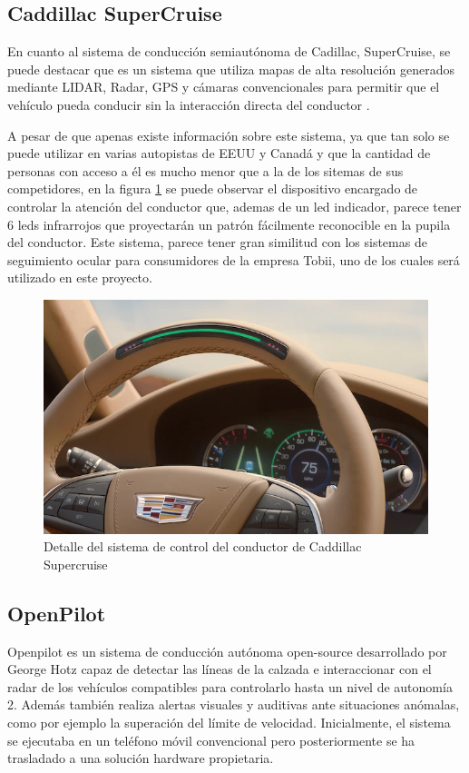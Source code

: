 \subsection{Caddillac SuperCruise}

En cuanto al sistema de conducción semiautónoma de Cadillac, SuperCruise, se puede destacar que es un sistema que utiliza mapas de alta resolución generados mediante LIDAR, Radar, GPS y cámaras convencionales para permitir que el vehículo pueda conducir sin la interacción directa del conductor \cite{CaddillacSupercruise}. 

A pesar de que apenas existe información sobre este sistema, ya que tan solo se puede utilizar en varias autopistas de EEUU y Canadá y que la cantidad de personas con acceso a él es mucho menor que a la de los sitemas de sus competidores, en la figura \ref{fig:cadillactobii} se puede observar el dispositivo encargado de controlar la atención del conductor que, ademas de un led indicador, parece tener 6 leds infrarrojos que proyectarán un patrón fácilmente reconocible en la pupila del conductor. Este sistema, parece tener gran similitud con los sistemas de seguimiento ocular para consumidores de la empresa Tobii, uno de los cuales será utilizado en este proyecto.

\begin{figure}[h!]
    \centering
    \includegraphics[width=.7\linewidth]{img/cadillacSupercruise.png}
    \caption{Detalle del sistema de control del conductor de Caddillac Supercruise}
    \label{fig:cadillactobii}
\end{figure}

\subsection{OpenPilot}

Openpilot es un sistema de conducción autónoma open-source desarrollado por George Hotz capaz de detectar las líneas de la calzada e interaccionar con el radar de los vehículos compatibles para controlarlo hasta un nivel de autonomía 2. Además también realiza alertas visuales y auditivas ante situaciones anómalas, como por ejemplo la superación del límite de velocidad.
Inicialmente, el sistema se ejecutaba en un teléfono móvil convencional pero posteriormente se ha trasladado a una solución hardware propietaria.

